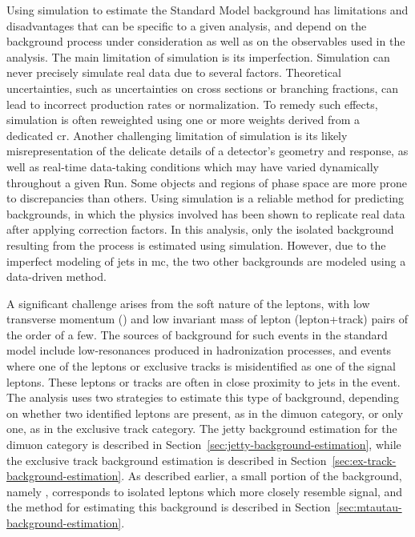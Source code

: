 Using simulation to estimate the Standard Model background has limitations and disadvantages that can be specific to a given analysis, and depend on the background process under consideration as well as on the observables used in the analysis. The main limitation of simulation is its imperfection. Simulation can never precisely simulate real data due to several factors. Theoretical uncertainties, such as uncertainties on cross sections or branching fractions, can lead to incorrect production rates or normalization. To remedy such effects, simulation is often reweighted using one or more weights derived from a dedicated \gls{cr}. Another challenging limitation of simulation is its likely misrepresentation of the delicate details of a detector’s geometry and response, as well as real-time data-taking conditions which may have varied dynamically throughout a given Run. Some objects and regions of phase space are more prone to discrepancies than others. Using simulation is a reliable method for predicting backgrounds, in which the physics involved has been shown to replicate real data after applying correction factors. In this analysis, only the isolated background resulting from the \ztautau process is estimated using simulation. However, due to the imperfect modeling of jets in \gls{mc}, the two other backgrounds are modeled using a data-driven method.

A significant challenge arises from the soft nature of the leptons, with low transverse momentum (\pt) and low invariant mass of lepton (lepton+track) pairs of the order of a few\GeV. The sources of background for such events in the standard model include low-\pt resonances produced in hadronization processes, and events where one of the leptons or exclusive tracks is misidentified as one of the signal leptons. These leptons or tracks are often in close proximity to jets in the event. The analysis uses two strategies to estimate this type of background, depending on whether two identified leptons are present, as in the dimuon category, or only one, as in the exclusive track category. The jetty background estimation for the dimuon category is described in Section~\ref{sec:jetty-background-estimation}, while the exclusive track background estimation is described in Section~\ref{sec:ex-track-background-estimation}. As described earlier, a small portion of the background, namely \ztautau, corresponds to isolated leptons which more closely resemble signal, and the method for estimating this background is described in Section~\ref{sec:mtautau-background-estimation}.

